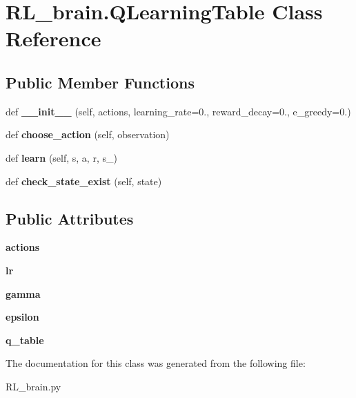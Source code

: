 \hypertarget{classRL__brain_1_1QLearningTable}{}\section{R\+L\+\_\+brain.\+Q\+Learning\+Table Class Reference}
\label{classRL__brain_1_1QLearningTable}
\subsection*{Public Member Functions}
\begin{DoxyCompactItemize}
\item 
\mbox{\label{classRL__brain_1_1QLearningTable_a47c70f0dd024d2d9e11d2af58f7284f8}} 
def {\bfseries \+\_\+\+\_\+init\+\_\+\+\_\+} (self, actions, learning\+\_\+rate=0., reward\+\_\+decay=0., e\+\_\+greedy=0.)
\item 
\mbox{\label{classRL__brain_1_1QLearningTable_a8f3ca1b9e334038e4d8ac5742b5eed54}} 
def {\bfseries choose\+\_\+action} (self, observation)
\item 
\mbox{\label{classRL__brain_1_1QLearningTable_a3e53ba1c1abbc65d603824d20f065e9f}} 
def {\bfseries learn} (self, s, a, r, s\+\_\+)
\item 
\mbox{\label{classRL__brain_1_1QLearningTable_a814f803be436cacadd4d8e68545eedc8}} 
def {\bfseries check\+\_\+state\+\_\+exist} (self, state)
\end{DoxyCompactItemize}
\subsection*{Public Attributes}
\begin{DoxyCompactItemize}
\item 
\mbox{\label{classRL__brain_1_1QLearningTable_ae5eea989b663341b11e926af08945dd8}} 
{\bfseries actions}
\item 
\mbox{\label{classRL__brain_1_1QLearningTable_afb3d5a73eafb9b35bbbede1ca988e5dd}} 
{\bfseries lr}
\item 
\mbox{\label{classRL__brain_1_1QLearningTable_a338ce567674007e07d6e2b0330c2293e}} 
{\bfseries gamma}
\item 
\mbox{\label{classRL__brain_1_1QLearningTable_a94b2731d67f9375537e966cba0c42e1b}} 
{\bfseries epsilon}
\item 
\mbox{\label{classRL__brain_1_1QLearningTable_ad4de4581c6b700612356e336526de27a}} 
{\bfseries q\+\_\+table}
\end{DoxyCompactItemize}


The documentation for this class was generated from the following file\+:\begin{DoxyCompactItemize}
\item 
R\+L\+\_\+brain.\+py\end{DoxyCompactItemize}
